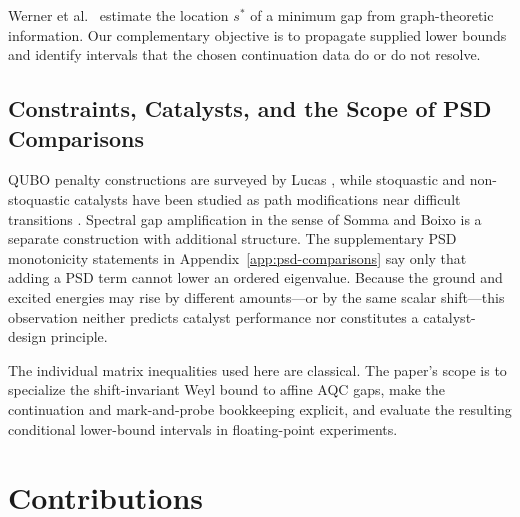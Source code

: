 \documentclass[11pt, a4paper]{article}
\begin{document}
Werner et al.\ \cite{PhysRevResearch.5.043236} estimate the location $s^*$ of a minimum gap from graph-theoretic information. Our complementary objective is to propagate supplied lower bounds and identify intervals that the chosen continuation data do or do not resolve.

\subsection{Constraints, Catalysts, and the Scope of PSD Comparisons}
QUBO penalty constructions are surveyed by Lucas \cite{Lucas2014}, while stoquastic and non-stoquastic catalysts have been studied as path modifications near difficult transitions \cite{SekiNishimori2012, Albash2019, Crosson2020designing}. Spectral gap amplification in the sense of Somma and Boixo \cite{SommaBoixo2013} is a separate construction with additional structure. The supplementary PSD monotonicity statements in Appendix~\ref{app:psd-comparisons} say only that adding a PSD term cannot lower an ordered eigenvalue. Because the ground and excited energies may rise by different amounts---or by the same scalar shift---this observation neither predicts catalyst performance nor constitutes a catalyst-design principle.

The individual matrix inequalities used here are classical. The paper's scope is to specialize the shift-invariant Weyl bound to affine AQC gaps, make the continuation and mark-and-probe bookkeeping explicit, and evaluate the resulting conditional lower-bound intervals in floating-point experiments.

\section{Contributions}
\end{document}
